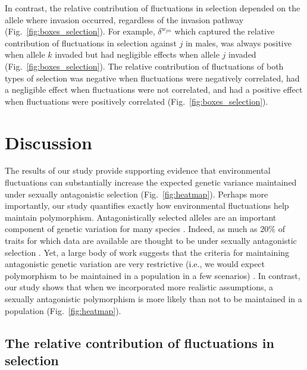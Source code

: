 \documentclass[12pt]{article}
\begin{document}
In contrast, the relative contribution of fluctuations in selection depended on the allele where invasion occurred, regardless of the invasion pathway (Fig.~\ref{fig:boxes_selection}). For example, $\delta^{w_{jm}}$ which captured the relative contribution of fluctuations in selection against $j$ in males, was always positive when allele $k$ invaded but had negligible effects when allele $j$ invaded (Fig.~\ref{fig:boxes_selection}). The relative contribution of fluctuations of both types of selection was negative when fluctuations were negatively correlated, had a negligible effect when fluctuations were not correlated, and had a positive effect when fluctuations were positively correlated (Fig.~\ref{fig:boxes_selection}).

\section{Discussion}
The results of our study provide supporting evidence that environmental fluctuations can substantially increase the expected genetic variance maintained under sexually antagonistic selection (Fig.~\ref{fig:heatmap}). Perhaps more importantly, our study quantifies exactly how environmental fluctuations help maintain polymorphism. Antagonistically selected alleles are an important component of genetic variation for many species \citep{foerster2007sexually,van2009intralocus,bonduriansky2009intralocus,innocenti2010sexually}. Indeed, as much as $20\%$ of traits for which data are available are thought to be under sexually antagonistic selection \citep{morrissey2016meta}. Yet, a large body of work suggests that the criteria for maintaining antagonistic genetic variation are very restrictive (i.e., we would expect polymorphism to be maintained in a population in a few scenarios) \citep{kidwell1977regions,pamilo1979genic,hedrick1999antagonistic,curtsinger1994antagonistic, patten2010fitness}. In contrast, our study shows that when we incorporated more realistic assumptions, a sexually antagonistic polymorphism is more likely than not to be maintained in a population (Fig.~\ref{fig:heatmap}).


\subsection*{The relative contribution of fluctuations in selection}
\end{document}
